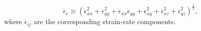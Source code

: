 \documentclass[tc, manuscript]{copernicus}
\begin{document}
\begin{equation} \label{eq:effstrain}
\dot{\epsilon}_e \equiv \left( \dot{\epsilon}_{xx}^2 +
\dot{\epsilon}_{yy}^2 + \dot{\epsilon}_{xx} \dot{\epsilon}_{yy} +
\dot{\epsilon}_{xy}^2 + \dot{\epsilon}_{xz}^2 +
\dot{\epsilon}_{yz}^2 \right)^\frac{1}{2},
\end{equation}
where $\dot{\epsilon}_{ij}$ are the corresponding strain-rate components.
\end{document}

